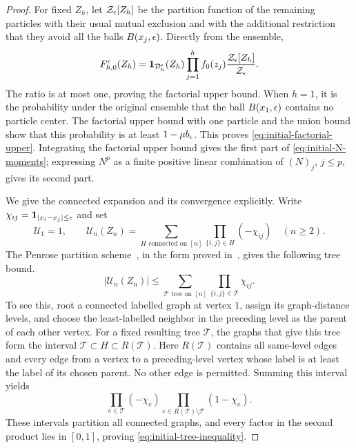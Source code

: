 \begin{proof}
For fixed $Z_h$, let $\mathcal Z_\epsilon[Z_h]$ be the partition function
of the remaining particles with their usual mutual exclusion and with
the additional restriction that they avoid all the balls
$B(x_j,\epsilon)$.  Directly from the ensemble,
\begin{equation}\label{eq:initial-insertion}
 F_{h,0}^{\epsilon}(Z_h)=
 \mathbf 1_{\mathcal D_h^\epsilon}(Z_h)\prod_{j=1}^h f_0(z_j)
 \frac{\mathcal Z_\epsilon[Z_h]}{\mathcal Z_\epsilon}.
\end{equation}
The ratio is at most one, proving the factorial upper bound.  When
$h=1$, it is the probability under the original ensemble that the ball
$B(x_1,\epsilon)$ contains no particle center.  The factorial upper bound
with one particle and the union bound show that this probability is at
least $1-\mu b_\epsilon$.  This proves \eqref{eq:initial-factorial-upper}.
Integrating the factorial upper bound gives the first part of
\eqref{eq:initial-N-moments}; expressing $N^p$ as a finite positive
linear combination of $(N)_j$, $j\le p$, gives its second part.

We give the connected expansion and its convergence explicitly.
Write $\chi_{ij}=\mathbf 1_{|x_i-x_j|\le\epsilon}$ and set
\[
 \mathcal U_1=1,
 \qquad
 \mathcal U_n(Z_n)=
   \sum_{H\text{ connected on }[n]}
      \prod_{\{i,j\}\in H}(-\chi_{ij})\quad(n\ge2).
\]
The Penrose partition scheme~\cite{Penrose1967}, in the form proved
in~\cite[Proposition~2.3.3]{BGSS2023}, gives the following tree bound.
\begin{equation}\label{eq:initial-tree-inequality}
 |\mathcal U_n(Z_n)|\le
   \sum_{\mathcal T\text{ tree on }[n]}
       \prod_{\{i,j\}\in\mathcal T}\chi_{ij}.
\end{equation}
To see this, root a connected labelled graph at vertex $1$, assign its
graph-distance levels, and choose the least-labelled neighbor in the
preceding level as the parent of each other vertex.  For a fixed
resulting tree $\mathcal T$, the graphs that give this tree form the
interval $\mathcal T\subset H\subset R(\mathcal T)$.  Here
$R(\mathcal T)$ contains all same-level edges and every edge from a
vertex to a preceding-level vertex whose label is at least the label
of its chosen parent.  No other edge is permitted.  Summing this
interval yields
\[
 \prod_{e\in\mathcal T}(-\chi_e)
 \prod_{e\in R(\mathcal T)\setminus\mathcal T}(1-\chi_e).
\]
These intervals partition all connected graphs, and every factor in
the second product lies in $[0,1]$, proving
\eqref{eq:initial-tree-inequality}.


\end{proof}

